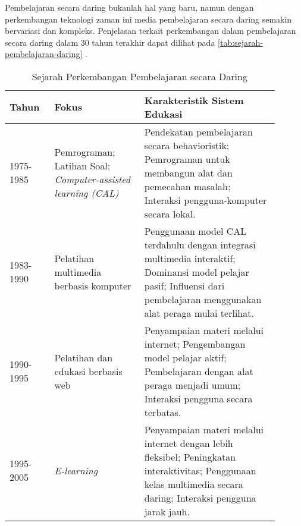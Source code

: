 Pembelajaran secara daring bukanlah hal yang baru, namun dengan perkembangan teknologi zaman ini media pembelajaran secara daring semakin bervariasi dan kompleks. Penjelasan terkait perkembangan dalam pembelajaran secara daring dalam 30 tahun terakhir dapat dilihat pada \autoref{tab:sejarah-pembelajaran-daring} \parencite{keengwe2010towards}.

\begin{longtable}{ |p{0.15\linewidth}|p{0.3\linewidth}|p{0.45\linewidth}| }
  \caption{Sejarah Perkembangan Pembelajaran secara Daring}\label{tab:sejarah-pembelajaran-daring}                                                                                                                                                                                                                                                              \\
  \hline
  \rowcolor{gray!30}
  Tahun          & Fokus                                                                & Karakteristik Sistem Edukasi                                                                                                                                                                                                                                          \\
  \hline
  1975-1985      & Pemrograman; Latihan Soal; \textit{Computer-assisted learning (CAL)} & Pendekatan pembelajaran secara behavioristik; Pemrograman untuk membangun alat dan pemecahan masalah; Interaksi pengguna-komputer secara lokal.                                                                                                                       \\
  \hline
  1983-1990      & Pelatihan multimedia berbasis komputer                               & Penggunaan model CAL terdahulu dengan integrasi multimedia interaktif; Dominansi model pelajar pasif; Influensi dari pembelajaran menggunakan alat peraga mulai terlihat.                                                                                             \\
  \hline
  1990-1995      & Pelatihan dan edukasi berbasis web                                   & Penyampaian materi melalui internet; Pengembangan model pelajar aktif; Pembelajaran dengan alat peraga menjadi umum; Interaksi pengguna secara terbatas.                                                                                                              \\
  \hline
  1995-2005      & \textit{E-learning}                                                  & Penyampaian materi melalui internet dengan lebih fleksibel; Peningkatan interaktivitas; Penggunaan kelas multimedia secara daring; Interaksi pengguna jarak jauh.                                                                                                     \\

\end{longtable}
